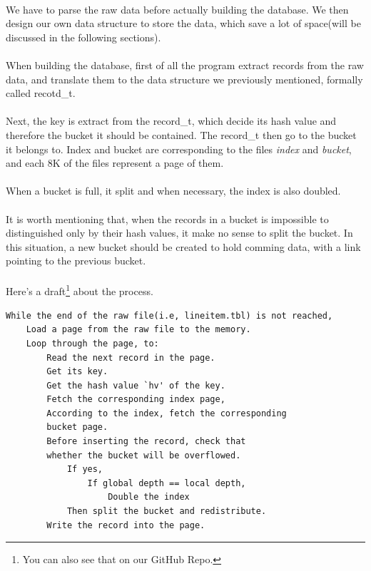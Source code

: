 \documentclass{article}
\begin{document}
        \paragraph{}
            We have to parse the raw data before actually building the database. We then design our own data structure to store the data, which save a lot of space(will be discussed in the following sections).
        \paragraph{}
            When building the database, first of all the program extract records from the raw data, and translate them to the data structure we previously mentioned, formally called recotd\_t. 
        \paragraph{}
            Next, the key is extract from the record\_t, which decide its hash value and therefore the bucket it should be contained. The record\_t then go to the bucket it belongs to. Index and bucket are corresponding to the files \emph{index} and \emph{bucket}, and each 8K of the files represent a page of them.
        \paragraph{}
            When a bucket is full, it split and when necessary, the index is also doubled.
        \paragraph{}
            It is worth mentioning that, when the records in a bucket is impossible to distinguished only by their hash values, it make no sense to split the bucket. In this situation, a new bucket should be created to hold comming data, with a link pointing to the previous bucket.
        \paragraph{}
            Here's a draft\footnote{You can also see that on our GitHub Repo.} about the process.
\begin{verbatim}
While the end of the raw file(i.e, lineitem.tbl) is not reached, 
    Load a page from the raw file to the memory.
    Loop through the page, to:
        Read the next record in the page.
        Get its key.
        Get the hash value `hv' of the key.
        Fetch the corresponding index page,
        According to the index, fetch the corresponding
        bucket page.
        Before inserting the record, check that 
        whether the bucket will be overflowed.
            If yes,
                If global depth == local depth,
                    Double the index
            Then split the bucket and redistribute.
        Write the record into the page.

\end{verbatim}
\end{document}
